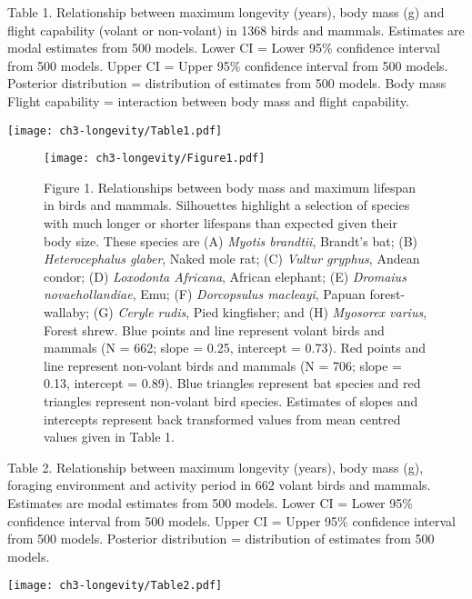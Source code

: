 \vspace{10 mm}

\begin{table}[h]
  \caption[ ]{Table 1. Relationship between maximum longevity (years), body mass (g) and flight capability (volant or non-volant) in 1368 birds and mammals. Estimates are modal estimates from 500 models. Lower CI = Lower 95\% confidence interval from 500 models. Upper CI = Upper 95\% confidence interval from 500 models. Posterior distribution = distribution of estimates from 500 models. Body mass \: Flight capability = interaction between body mass and flight capability.}
  \label{tbl:Table 1.}
  \texttt{[image: ch3-longevity/Table1.pdf]}
\end{table}


\begin{figure}[p!]
  \centering
  \texttt{[image: ch3-longevity/Figure1.pdf]}
  \caption[ ]{Figure 1. Relationships between body mass and maximum lifespan in birds and mammals. Silhouettes highlight a selection of species with much longer or shorter lifespans than expected given their body size. These species are (A) \textit{Myotis brandtii}, Brandt's bat; (B) \textit{Heterocephalus glaber}, Naked mole rat; (C) \textit{Vultur gryphus}, Andean condor; (D) \textit{Loxodonta Africana}, African elephant; (E) \textit{Dromaius novaehollandiae}, Emu; (F) \textit{Dorcopsulus macleayi}, Papuan forest-wallaby; (G) \textit{Ceryle rudis}, Pied kingfisher; and (H) \textit{Myosorex varius}, Forest shrew. Blue points and line represent volant birds and mammals (N = 662; slope = 0.25, intercept = 0.73). Red points and line represent non-volant birds and mammals (N = 706; slope = 0.13, intercept = 0.89). Blue triangles represent bat species and red triangles represent non-volant bird species. Estimates of slopes and intercepts represent back transformed values from mean centred values given in Table 1.}
  \label{figure:Figure 1.}
\end{figure}


\begin{table}[H]
  \caption[ ]{Table 2. Relationship between maximum longevity (years), body mass (g), foraging environment and activity period in 662 volant birds and mammals. Estimates are modal estimates from 500 models. Lower CI = Lower 95\% confidence interval from 500 models. Upper CI = Upper 95\% confidence interval from 500 models. Posterior distribution = distribution of estimates from 500 models.}
  \label{tbl:Table 2.}
  \texttt{[image: ch3-longevity/Table2.pdf]}
\end{table}


